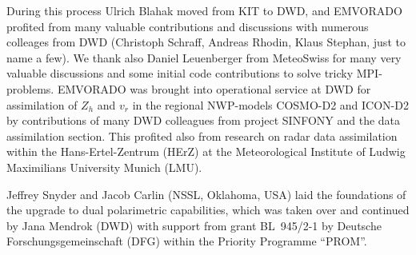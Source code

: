 \documentclass[10pt,a4paper,twoside,headinclude,footinclude,parskip=half]{scrartcl}
\begin{document}
During this process Ulrich Blahak moved from KIT to DWD, and EMVORADO profited from many valuable contributions and
discussions with numerous colleages from DWD (Christoph Schraff, Andreas Rhodin, Klaus Stephan, just to name a few). We thank also Daniel Leuenberger from MeteoSwiss for many very valuable discussions
and some initial code contributions to solve tricky MPI-problems. EMVORADO was brought into operational service at DWD for assimilation of $Z_h$ and $v_r$ in the regional NWP-models COSMO-D2 and ICON-D2 by contributions
of many DWD colleagues from project SINFONY and the data assimilation section. This profited also from research on radar data assimilation within the Hans-Ertel-Zentrum (HErZ) at the Meteorological Institute of Ludwig Maximilians University Munich (LMU).

Jeffrey Snyder and Jacob Carlin (NSSL, Oklahoma, USA) laid the foundations of the upgrade to dual polarimetric capabilities, which was taken over and continued by Jana Mendrok (DWD) with support from grant BL~945/2-1
by Deutsche Forschungsgemeinschaft (DFG) within the Priority Programme ``PROM''.

\newpage

 

\end{document}
